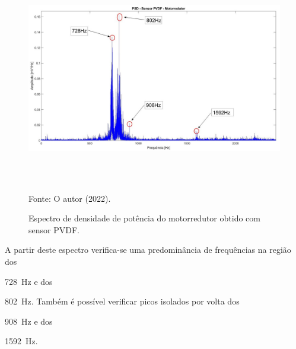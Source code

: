 \documentclass[
	12pt,				
	oneside,			
	a4paper,			
	english,			
	brazil,	
	sumario=abnt-6027-2012		
	]{abntex2ppgsi}
\begin{document}
{{{{{{{\begin{figure}[H]
\centering
\caption {Espectro de densidade de potência do motorredutor obtido com sensor PVDF.}
\includegraphics[width=\textwidth,height=100mm,keepaspectratio]{PSD_PVDF_MOTORREDUTOR} \\
Fonte: O autor (2022).
\label{PSD_MOTORREDUTOR}
\end{figure}




A partir deste espectro verifica-se uma predominância de frequências na região dos {\SI{728}{\hertz} e dos {\SI{802}{\hertz}. Também é possível verificar picos isolados por volta dos {\SI{908}{\hertz} e dos {\SI{1592}{\hertz}. 

}}}}}}}}}}}
\end{document}
